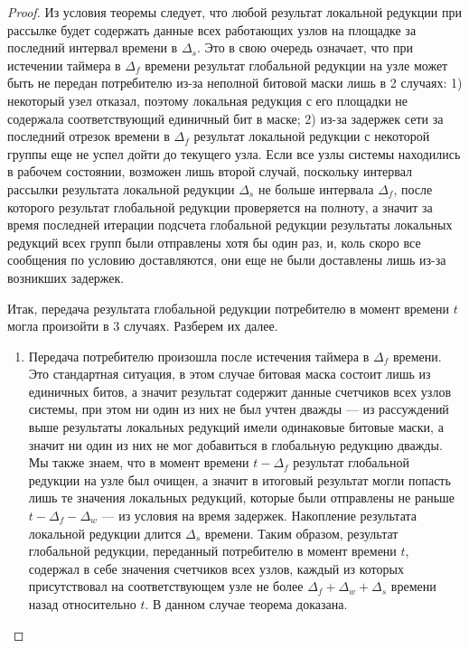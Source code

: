 \documentclass{article}
\theoremstyle{plain}
\theoremstyle{plain}
\theoremstyle{plain}
\theoremstyle{plain}
\theoremstyle{definition}
\theoremstyle{remark}
\theoremstyle{plain}
\begin{document}
\begin{proof}
    Из условия теоремы следует, что любой результат локальной редукции при рассылке будет содержать данные всех работающих узлов на площадке за последний интервал времени в $\Delta_s$. Это в свою очередь означает, что при истечении таймера в $\Delta_f$ времени результат глобальной редукции на узле может быть не передан потребителю из-за неполной битовой маски лишь в 2 случаях: 1) некоторый узел отказал, поэтому локальная редукция с его площадки не содержала соответствующий единичный бит в маске; 2) из-за задержек сети за последний отрезок времени в $\Delta_f$ результат локальной редукции с некоторой группы еще не успел дойти до текущего узла. Если все узлы системы находились в рабочем состоянии, возможен лишь второй случай, поскольку интервал рассылки результата локальной редукции $\Delta_s$ не больше интервала $\Delta_f$, после которого результат глобальной редукции проверяется на полноту, а значит за время последней итерации подсчета глобальной редукции результаты локальных редукций всех групп были отправлены хотя бы один раз, и, коль скоро все сообщения по условию доставляются, они еще не были доставлены лишь из-за возникших задержек.
    
    Итак, передача результата глобальной редукции потребителю в момент времени $t$ могла произойти в 3 случаях. Разберем их далее.
    
    \begin{enumerate}
        \item Передача потребителю произошла после истечения таймера в $\Delta_f$ времени. Это стандартная ситуация, в этом случае битовая маска состоит лишь из единичных битов, а значит результат содержит данные счетчиков всех узлов системы, при этом ни один из них не был учтен дважды --- из рассуждений выше результаты локальных редукций имели одинаковые битовые маски, а значит ни один из них не мог добавиться в глобальную редукцию дважды. Мы также знаем, что в момент времени $t - \Delta_f$ результат глобальной редукции на узле был очищен, а значит в итоговый результат могли попасть лишь те значения локальных редукций, которые были отправлены не раньше $t - \Delta_f - \Delta_w$ --- из условия на время задержек. Накопление результата локальной редукции длится $\Delta_s$ времени. Таким образом, результат глобальной редукции, переданный потребителю в момент времени $t$, содержал в себе значения счетчиков всех узлов, каждый из которых присутствовал на соответствующем узле не более $\Delta_f + \Delta_w + \Delta_s$ времени назад относительно $t$. В данном случае теорема доказана.
        

\end{enumerate}
\end{proof}
\end{document}
